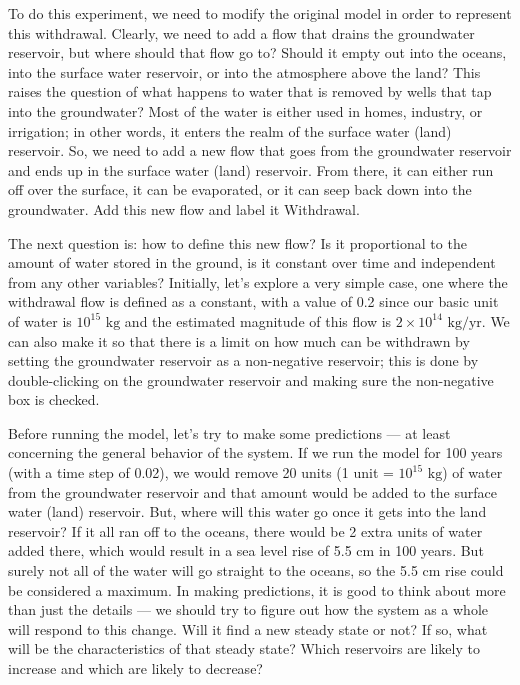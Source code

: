 \documentclass[11pt,letterpaper]{article}
\begin{document}
To do this experiment, we need to modify the original model in order to represent this withdrawal. Clearly, we need to add a flow that drains the groundwater reservoir, but where should that flow go to? Should it empty out into the oceans, into the surface water reservoir, or into the atmosphere above the land? This raises the question of what happens to water that is removed by wells that tap into the groundwater? Most of the water is either used in homes, industry, or irrigation; in other words, it enters the realm of the surface water (land) reservoir. So, we need to add a new flow that goes from the groundwater reservoir and ends up in the surface water (land) reservoir. From there, it can either run off over the surface, it can be evaporated, or it can seep back down into the groundwater. Add this new flow and label it Withdrawal. 

The next question is: how to define this new flow? Is it proportional to the amount of water stored in the ground, is it constant over time and independent from any other variables? Initially, let's explore a very simple case, one where the withdrawal flow is defined as a constant, with a value of 0.2 since our basic unit of water is $10^{15}\mbox{ kg}$ and the estimated magnitude of this flow is $2\times 10^{14}\mbox{ kg/yr}$. We can also make it so that there is a limit on how much can be withdrawn by setting the groundwater reservoir as a non-negative reservoir; this is done by double-clicking on the groundwater reservoir and making sure the non-negative box is checked.

Before running the model, let's try to make some predictions --- at least concerning the general behavior of the system. If we run the model for 100 years (with a time step of 0.02), we would remove 20 units (1 unit = $10^{15}\mbox{ kg}$) of water from the groundwater reservoir and that amount would be added to the surface water (land) reservoir. But, where will this water go once it gets into the land reservoir? If it all ran off to the oceans, there would be 2 extra units of water added there, which would result in a sea level rise of 5.5 cm in 100 years. But surely not all of the water will go straight to the oceans, so the 5.5 cm rise could be considered a maximum. In making predictions, it is good to think about more than just the details --- we should try to figure out how the system as a whole will respond to this change. Will it find a new steady state or not? If so, what will be the characteristics of that steady state? Which reservoirs are likely to increase and which are likely to decrease?
\end{document}
